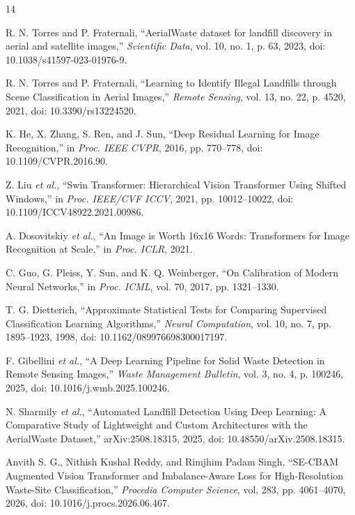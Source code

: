 \documentclass[journal]{IEEEtran}
\begin{document}
\begin{thebibliography}{14}

R. N. Torres and P. Fraternali, ``AerialWaste dataset for landfill discovery in aerial and satellite images,'' \emph{Scientific Data}, vol. 10, no. 1, p. 63, 2023, doi: 10.1038/s41597-023-01976-9.

R. N. Torres and P. Fraternali, ``Learning to Identify Illegal Landfills through Scene Classification in Aerial Images,'' \emph{Remote Sensing}, vol. 13, no. 22, p. 4520, 2021, doi: 10.3390/rs13224520.

K. He, X. Zhang, S. Ren, and J. Sun, ``Deep Residual Learning for Image Recognition,'' in \emph{Proc. IEEE CVPR}, 2016, pp. 770--778, doi: 10.1109/CVPR.2016.90.

Z. Liu \emph{et al.}, ``Swin Transformer: Hierarchical Vision Transformer Using Shifted Windows,'' in \emph{Proc. IEEE/CVF ICCV}, 2021, pp. 10012--10022, doi: 10.1109/ICCV48922.2021.00986.

A. Dosovitskiy \emph{et al.}, ``An Image is Worth 16x16 Words: Transformers for Image Recognition at Scale,'' in \emph{Proc. ICLR}, 2021.

C. Guo, G. Pleiss, Y. Sun, and K. Q. Weinberger, ``On Calibration of Modern Neural Networks,'' in \emph{Proc. ICML}, vol. 70, 2017, pp. 1321--1330.

T. G. Dietterich, ``Approximate Statistical Tests for Comparing Supervised Classification Learning Algorithms,'' \emph{Neural Computation}, vol. 10, no. 7, pp. 1895--1923, 1998, doi: 10.1162/089976698300017197.

F. Gibellini \emph{et al.}, ``A Deep Learning Pipeline for Solid Waste Detection in Remote Sensing Images,'' \emph{Waste Management Bulletin}, vol. 3, no. 4, p. 100246, 2025, doi: 10.1016/j.wmb.2025.100246.

N. Sharmily \emph{et al.}, ``Automated Landfill Detection Using Deep Learning: A Comparative Study of Lightweight and Custom Architectures with the AerialWaste Dataset,'' arXiv:2508.18315, 2025, doi: 10.48550/arXiv.2508.18315.

Anvith S. G., Nithish Kushal Reddy, and Rimjhim Padam Singh, ``SE-CBAM Augmented Vision Transformer and Imbalance-Aware Loss for High-Resolution Waste-Site Classification,'' \emph{Procedia Computer Science}, vol. 283, pp. 4061--4070, 2026, doi: 10.1016/j.procs.2026.06.467.


\end{thebibliography}
\end{document}
